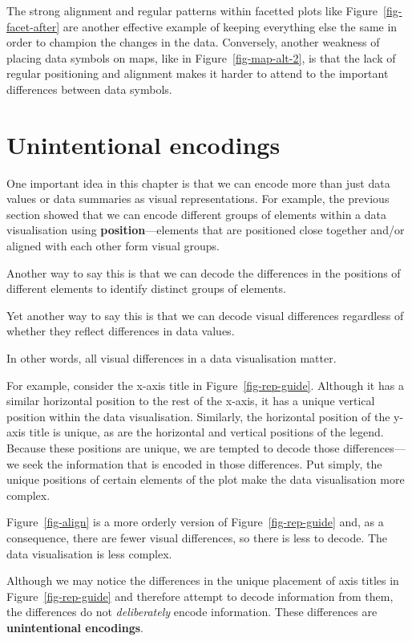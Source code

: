 \documentclass[
  letterpaper,
  DIV=11,
  numbers=noendperiod]{scrreprt}
\begin{document}
The strong alignment and regular patterns within facetted plots like
Figure~\ref{fig-facet-after} are another effective example of keeping
everything else the same in order to champion the changes in the data.
Conversely, another weakness of placing data symbols on maps, like in
Figure~\ref{fig-map-alt-2}, is that the lack of regular positioning and
alignment makes it harder to attend to the important differences between
data symbols.

\section{Unintentional encodings}\label{sec-unintentional}

One important idea in this chapter is that we can encode more than just
data values or data summaries as visual representations. For example,
the previous section showed that we can encode different groups of
elements within a data visualisation using \textbf{position}---elements
that are positioned close together and/or aligned with each other form
visual groups.

Another way to say this is that we can decode the differences in the
positions of different elements to identify distinct groups of elements.

Yet another way to say this is that we can decode visual differences
regardless of whether they reflect differences in data values.

In other words, all visual differences in a data visualisation matter.

For example, consider the x-axis title in Figure~\ref{fig-rep-guide}.
Although it has a similar horizontal position to the rest of the x-axis,
it has a unique vertical position within the data visualisation.
Similarly, the horizontal position of the y-axis title is unique, as are
the horizontal and vertical positions of the legend. Because these
positions are unique, we are tempted to decode those differences---we
seek the information that is encoded in those differences. Put simply,
the unique positions of certain elements of the plot make the data
visualisation more complex.

Figure~\ref{fig-align} is a more orderly version of
Figure~\ref{fig-rep-guide} and, as a consequence, there are fewer visual
differences, so there is less to decode. The data visualisation is less
complex.

Although we may notice the differences in the unique placement of axis
titles in Figure~\ref{fig-rep-guide} and therefore attempt to decode
information from them, the differences do not \emph{deliberately} encode
information. These differences are \textbf{unintentional encodings}.
\end{document}

